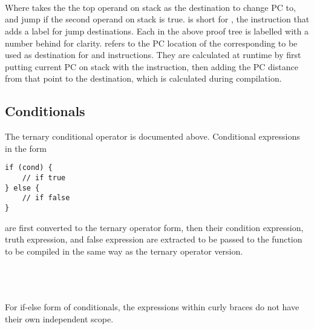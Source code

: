\begin{prooftree}
\end{prooftree}\\\\\\
Where  takes the the top operand on stack as the destination to change PC to, and jump if the second operand on stack is true.  is short for , the instruction that adds a label for jump destinations. Each  in the above proof tree is labelled with a number behind for clarity.  refers to the PC location of the corresponding  to be used as destination for  and  instructions. They are calculated at runtime by first putting current PC on stack with the  instruction, then adding the PC distance from that point to the destination, which is calculated during compilation. 

\subsection{Conditionals}
The ternary conditional operator is documented above. Conditional expressions in the form 
\begin{verbatim}
if (cond) {
    // if true
} else {
    // if false
}
\end{verbatim}
are first converted to the ternary operator form, then their condition expression, truth expression, and false expression are extracted to be passed to the  function to be compiled in the same way as the ternary operator version. \\\\
\begin{prooftree}
\end{prooftree}\\\\
For if-else form of conditionals, the expressions within curly braces do not have their own independent scope. 

